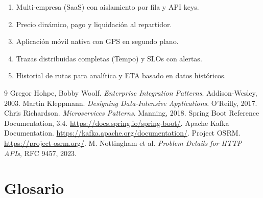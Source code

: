 \documentclass[10pt,letterpaper,twocolumn,oneside]{report}
\begin{document}
\begin{enumerate}[leftmargin=1.2cm]
  \item Multi-empresa (SaaS) con aislamiento por fila y API keys.
  \item Precio dinámico, pago y liquidación al repartidor.
  \item Aplicación móvil nativa con GPS en segundo plano.
  \item Trazas distribuidas completas (Tempo) y SLOs con alertas.
  \item Historial de rutas para analítica y ETA basado en datos históricos.
\end{enumerate}

\begin{thebibliography}{9}
 Gregor Hohpe, Bobby Woolf. \emph{Enterprise Integration Patterns}. Addison-Wesley, 2003.
 Martin Kleppmann. \emph{Designing Data-Intensive Applications}. O'Reilly, 2017.
 Chris Richardson. \emph{Microservices Patterns}. Manning, 2018.
 Spring Boot Reference Documentation, 3.4. \url{https://docs.spring.io/spring-boot/}.
 Apache Kafka Documentation. \url{https://kafka.apache.org/documentation/}.
 Project OSRM. \url{https://project-osrm.org/}.
 M. Nottingham et al. \emph{Problem Details for HTTP APIs}, RFC 9457, 2023.
\end{thebibliography}

\appendix
\chapter{Glosario}
\end{document}
